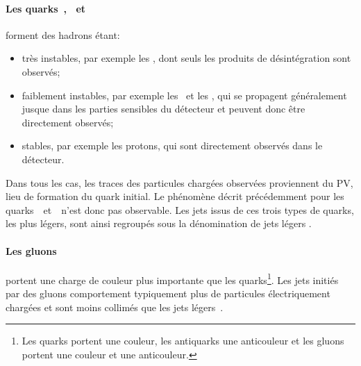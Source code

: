 \paragraph{Les quarks~\quarkd, \quarku\ et~\quarks} forment des hadrons étant:
\begin{itemize}
\item très instables, par exemple les \pionnull, dont seuls les produits de désintégration sont observés;
\item faiblement instables, par exemple les \Kaonplus\ et les \Kaonnull, qui se propagent généralement jusque dans les parties sensibles du détecteur et peuvent donc être directement observés;
\item stables, par exemple les protons, qui sont directement observés dans le détecteur.
\end{itemize}
Dans tous les cas, les traces des particules chargées observées proviennent du PV, lieu de formation du quark initial.
Le phénomène décrit précédemment pour les quarks~\quarkb\ et~\quarkc\ n'est donc pas observable.
Les jets issus de ces trois types de quarks, les plus légers, sont ainsi regroupés sous la dénomination de \og jets légers \fg.
\paragraph{Les gluons} portent une charge de couleur plus importante que les quarks\footnote{Les quarks portent une couleur, les antiquarks une anticouleur et les gluons portent une couleur et une anticouleur.}.
Les jets initiés par des gluons comportement typiquement plus de particules électriquement chargées et sont moins collimés que les jets légers~\cite{CMS-PAS-JME-13-002}.
